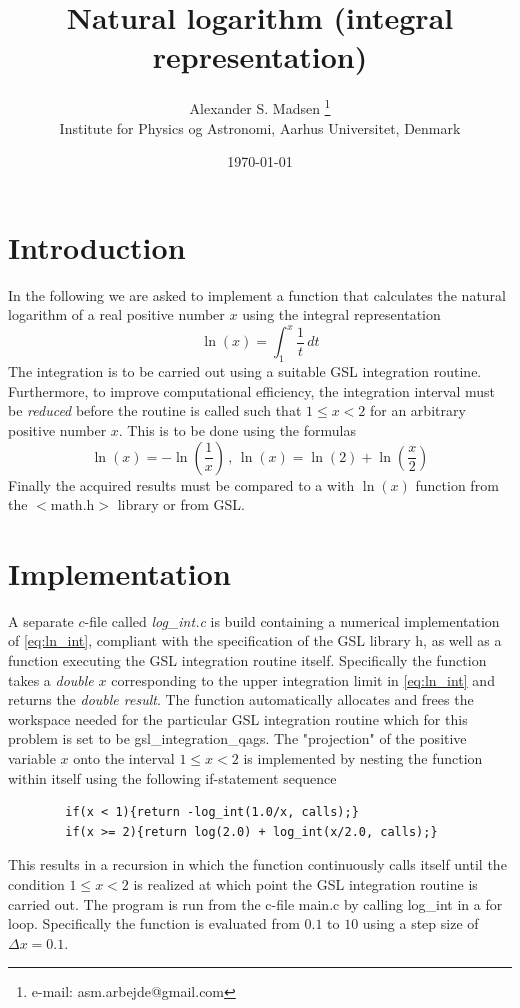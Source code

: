 \documentclass[a4paper,oneside,article,10pt]{memoir}
\title{\Huge Natural logarithm (integral representation)}
\author{Alexander S. Madsen \thanks{e-mail: asm.arbejde@gmail.com}\\
Institute for Physics og Astronomi, Aarhus Universitet, Denmark}
\date{\today} %
\numberwithin{equation}{section}
\begin{document}
\maketitle


\chapter{Introduction}
In the following we are asked to implement a function that calculates the natural logarithm of a real positive number $x$ using the integral representation
\begin{equation}
  \ln(x) = \int_1^x \frac{1}{t} \,dt\label{eq:ln_int}
\end{equation}
The integration is to be carried out using a suitable GSL integration routine. Furthermore, to improve computational efficiency, the integration interval must be \textit{reduced} before the routine is called such that $1\leq x < 2$ for an arbitrary positive number $x$. This is to be done using the formulas
\begin{equation}
  \ln(x) = -\ln\left(\frac{1}{x}\right)\, , \, \ln(x)=\ln(2)+\ln\left(\frac{x}{2}\right)
\end{equation}
Finally the acquired results must be compared to a with $\ln(x)$ function from the $<\text{math.h}>$ library or from GSL.

\chapter{Implementation}
 A separate $c$-file called \textit{log\_int.c} is build containing a numerical implementation of \cref{eq:ln_int}, compliant with the specification of the GSL library $\text{h}$, as well as a function executing the GSL integration routine itself. 
 Specifically the function takes a \textit{double} $x$ corresponding to the upper integration limit in \cref{eq:ln_int} and returns the \textit{double result}. The function automatically allocates and frees the workspace needed for the particular GSL integration routine which for this problem is set to be gsl\_integration\_qags. 
 The "projection" of the positive variable $x$ onto the interval $1\leq x < 2$ is implemented by nesting the function within itself using the following if-statement sequence 
 \begin{lstlisting}
 		if(x < 1){return -log_int(1.0/x, calls);}
 		if(x >= 2){return log(2.0) + log_int(x/2.0, calls);}
 \end{lstlisting}
This results in a recursion in which the function continuously calls itself until the condition $1\leq x < 2$ is realized at which point the GSL integration routine is carried out.
The program is run from the c-file main.c by calling log\_int in a for loop. Specifically the function is evaluated from $0.1$ to $10$ using a step size of $\Delta x = 0.1$. 
\end{document}
